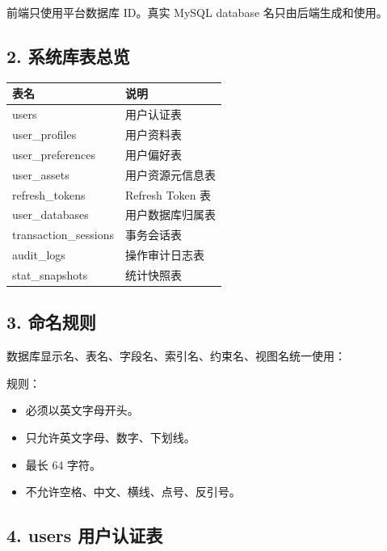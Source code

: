 \documentclass[
  a4paper,
  UTF8]{ctexart}
\newenvironment{Shaded}{}{}
\newcommand{\NormalTok}[1]{#1}
\providecommand{\tightlist}{%
  \setlength{\itemsep}{0pt}\setlength{\parskip}{0pt}}
\begin{document}
前端只使用平台数据库 ID。真实 MySQL database 名只由后端生成和使用。

\hypertarget{ux7cfbux7edfux5e93ux8868ux603bux89c8}{%
\subsection{2.
系统库表总览}\label{ux7cfbux7edfux5e93ux8868ux603bux89c8}}

\begin{longtable}[]{@{}ll@{}}
\toprule
表名 & 说明 \\
\midrule
\endhead
users & 用户认证表 \\
user\_profiles & 用户资料表 \\
user\_preferences & 用户偏好表 \\
user\_assets & 用户资源元信息表 \\
refresh\_tokens & Refresh Token 表 \\
user\_databases & 用户数据库归属表 \\
transaction\_sessions & 事务会话表 \\
audit\_logs & 操作审计日志表 \\
stat\_snapshots & 统计快照表 \\
\bottomrule
\end{longtable}

\hypertarget{ux547dux540dux89c4ux5219}{%
\subsection{3. 命名规则}\label{ux547dux540dux89c4ux5219}}

数据库显示名、表名、字段名、索引名、约束名、视图名统一使用：

\begin{Shaded}
\end{Shaded}

规则：

\begin{itemize}
\tightlist
\item
  必须以英文字母开头。
\item
  只允许英文字母、数字、下划线。
\item
  最长 64 字符。
\item
  不允许空格、中文、横线、点号、反引号。
\end{itemize}

\hypertarget{users-ux7528ux6237ux8ba4ux8bc1ux8868}{%
\subsection{4. users
用户认证表}\label{users-ux7528ux6237ux8ba4ux8bc1ux8868}}
\end{document}

